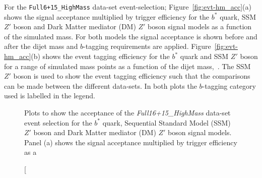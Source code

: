 For the \verb|Full6+15_HighMass| data-set event-selection;
Figure~\ref{fig:evt-hm_acc}(a) shows the signal acceptance multiplied by trigger efficiency
for the $b^*$ quark, SSM $Z'$ boson and Dark Matter mediator (DM) $Z'$ boson signal models
as a function of the simulated mass.
For both models the signal acceptance is shown before and after the
dijet mass and $b$-tagging requirements are applied.
Figure~\ref{fig:evt-hm_acc}(b) shows the event tagging efficiency
for the $b^*$ quark and SSM $Z'$ boson for a range of simulated mass points
as a function of the dijet mass,~\mjj.
The SSM $Z'$ boson is used to show the event tagging efficiency such that the
comparisons can be made between the different data-sets.
In both plots the $b$-tagging category used is labelled in the legend.

\begin{figure}[!ht]
  \begin{center}
    \captionsetup[subfigure]{aboveskip=0pt,justification=centering}
  \end{center}
  \caption[Plots to show the acceptance of the \textit{Full16+15\_HighMass} data-set event selection for the $b^*$ quark,
            Sequential Standard Model (SSM) $Z'$ boson and Dark Matter mediator (DM) $Z'$ boson signal models.
            Panel (a) shows the signal acceptance multiplied by trigger efficiency as a

\end{figure}
